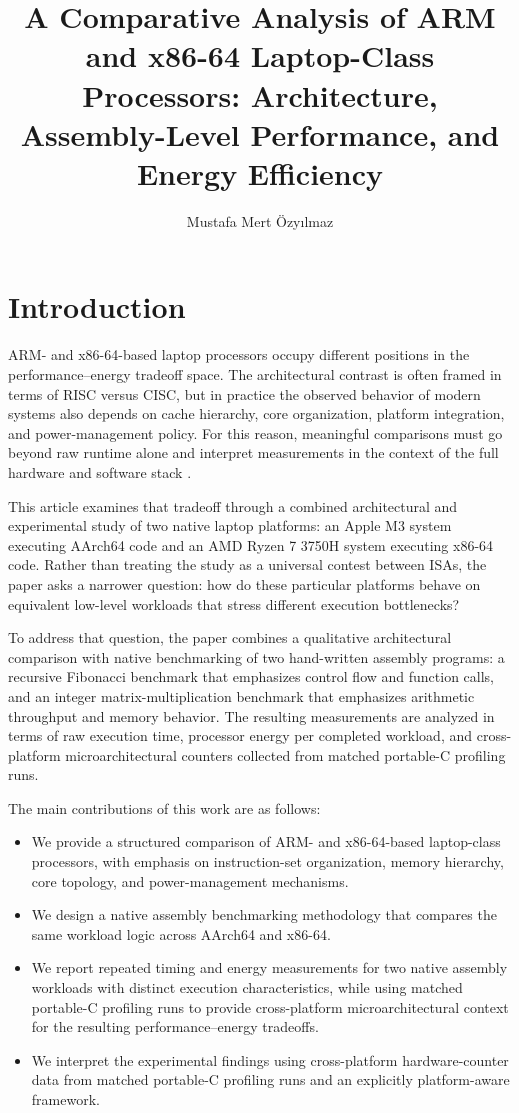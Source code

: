 \documentclass{tcsa}
\title{A Comparative Analysis of ARM and x86-64 Laptop-Class Processors: Architecture, Assembly-Level Performance, and Energy Efficiency}
\author[1,*]{Mustafa Mert Özyılmaz \orcid{0009-0004-3684-021X}}
\affil[1]{Sorbonne Université, Department of Computer Engineering, Paris Île-de-France, France, 75005}
\begin{document}
\raggedbottom
\maketitle

\section{Introduction}

ARM- and x86-64-based laptop processors occupy different positions in the
performance--energy tradeoff space. The architectural contrast is often framed in
terms of RISC versus CISC, but in practice the observed behavior of modern systems
also depends on cache hierarchy, core organization, platform integration, and
power-management policy. For this reason, meaningful comparisons must go beyond raw
runtime alone and interpret measurements in the context of the full hardware and
software stack \cite{hennessy_patterson_2019,blem2013}.

This article examines that tradeoff through a combined architectural and experimental
study of two native laptop platforms: an Apple M3 system executing AArch64 code and
an AMD Ryzen 7 3750H system executing x86-64 code. Rather than treating the study as
a universal contest between ISAs, the paper asks a narrower question: how do these
particular platforms behave on equivalent low-level workloads that stress different
execution bottlenecks?

To address that question, the paper combines a qualitative architectural comparison
with native benchmarking of two hand-written assembly programs: a recursive
Fibonacci benchmark that emphasizes control flow and function calls, and an integer
matrix-multiplication benchmark that emphasizes arithmetic throughput and memory
behavior. The resulting measurements are analyzed in terms of raw execution time,
processor energy per completed workload, and cross-platform microarchitectural
counters collected from matched portable-C profiling runs.

The main contributions of this work are as follows:
\begin{itemize}
    \item We provide a structured comparison of ARM- and x86-64-based laptop-class
    processors, with emphasis on instruction-set organization, memory hierarchy,
    core topology, and power-management mechanisms.
    \item We design a native assembly benchmarking methodology that compares the same
    workload logic across AArch64 and x86-64.
    \item We report repeated timing and energy measurements for two native assembly workloads with distinct execution characteristics, while using matched portable-C profiling runs to provide cross-platform microarchitectural context for the resulting performance--energy tradeoffs.

    \item We interpret the experimental findings using cross-platform hardware-counter data from matched portable-C profiling runs and an explicitly platform-aware framework.

\end{itemize}
\end{document}
